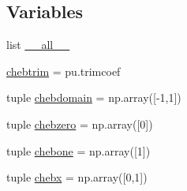 \subsection*{Variables}
\begin{DoxyCompactItemize}
\item 
list \hyperlink{namespacepyneb_1_1utils_1_1chebyshev_aa4a022e6ddacd362b83964da5cc5d044}{\+\_\+\+\_\+all\+\_\+\+\_\+}
\item 
\hyperlink{namespacepyneb_1_1utils_1_1chebyshev_ab0a0ced0266ea763728bee66b728cbff}{chebtrim} = pu.\+trimcoef
\item 
tuple \hyperlink{namespacepyneb_1_1utils_1_1chebyshev_abd5a8e86847ca6ea59d2a192f28604d4}{chebdomain} = np.\+array(\mbox{[}-\/1,1\mbox{]})
\item 
tuple \hyperlink{namespacepyneb_1_1utils_1_1chebyshev_aadda3e168aefd0f4b28a9d7cab6ad412}{chebzero} = np.\+array(\mbox{[}0\mbox{]})
\item 
tuple \hyperlink{namespacepyneb_1_1utils_1_1chebyshev_ad07bc7eff7bee500f8644792e4f69712}{chebone} = np.\+array(\mbox{[}1\mbox{]})
\item 
tuple \hyperlink{namespacepyneb_1_1utils_1_1chebyshev_a0ce7dddbafb225b28442052d01115054}{chebx} = np.\+array(\mbox{[}0,1\mbox{]})
\end{DoxyCompactItemize}


